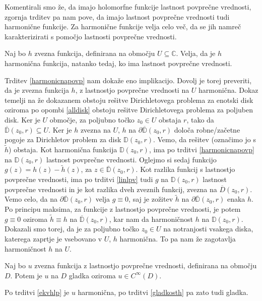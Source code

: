 \documentclass[mat1]{fmfdelo}
\newcommand{\C}{\mathbb C}
\begin{document}
    \begin{opomba}
        Komentirali smo že, da imajo holomorfne funkcije lastnost povprečne vrednosti, zgornja trditev pa nam pove, da imajo lastnost povprečne vrednosti tudi harmonične funkcije. 
        Za harmonične funkcije velja celo več, da se jih namreč karakterizirati s pomočjo lastnosti povprečne vrednosti. 
    \end{opomba}
    \begin{trditev}
        \label{ekvhlp}
        Naj bo $h$ zvezna funkcija, definirana na območju $U \subseteq \C$. Velja, da je $h$ harmonična funkcija, natanko tedaj, ko ima lastnost povprečne vrednosti.
    \end{trditev}
    \begin{dokaz}
        Trditev \ref{harmonicnapovp} nam dokaže eno implikacijo. Dovolj je torej preveriti, da je zvezna funkcija $h$, z lastnostjo povprečne vrednosti na $U$ harmonična. 
        Dokaz temelji na že dokazanem obstoju rešitve Dirichletovega problema za enotski disk oziroma po opombi \ref{alldisk} obstoju rešitve Dirichletovega problema za poljuben disk. 
        \newline
        Ker je $U$ območje, za poljubno točko $z_0 \in U$ obstaja $r$, tako da $\overline{\mathbb{D}}(z_0,r) \subseteq U$. Ker je $h$ zvezna na $U$, $h$ na $\partial \overline{\mathbb{D}}(z_0, r)$ določa robne/začetne pogoje za Dirichletov problem za disk $\mathbb{D}(z_0,r)$.
        Vemo, da rešitev (označimo jo s $\widetilde{h}$) obstaja. 
        Kot harmonična funkcija $\mathbb{D}(z_0, r)$, ima po trditvi \ref{harmonicnapovp} na $\mathbb{D}(z_0, r)$ lastnost povprečne vrednosti. 
        Oglejmo si sedaj funkcijo $g(z) = h(z) - \widetilde{h}(z)$, za $z \in \overline{\mathbb{D}}(z_0,r)$. 
        Kot razlika funkcij s lastnostjo povprečne vrednosti, ima po trditvi \ref{linlpv} tudi $g$ na $\mathbb{D}(z_0, r)$ lastnost povprečne vrednosti in je kot razlika dveh zveznih funkcij, zvezna na $\overline{D}(z_0, r)$.
        Vemo celo, da na $\partial \overline{\mathbb{D}}(z_0, r)$ velja $g \equiv 0$, saj je zožitev $\widetilde{h}$ na $\partial \overline{\mathbb{D}}(z_0,r)$ enaka $h$. 
        Po principu maksima, za funkcije z lastnostjo povprečne vrednosti, je potem $g \equiv 0$ oziroma $\widetilde{h} \equiv h$ na $\overline{\mathbb{D}}(z_0, r)$, kar nam da harmoničnost $h$ na $\mathbb{D}(z_0, r)$. 
        Dokazali smo torej, da je za poljubno točko $z_0 \in U$ na notranjosti vsakega diska, katerega zaprtje je vsebovano v $U$, $h$ harmonična. To pa nam že zagotavlja harmoničnost $h$ na $U$. 
    \end{dokaz}
    \begin{trditev}
        Naj bo $u$ zvezna funkcija z lastnostjo povprečne vrednosti, definirana na območju $D$. Potem je $u$ na $D$ gladka oziroma $u \in C^{\infty}(D)$.
    \end{trditev}
    \begin{dokaz}
        Po trditvi \ref{ekvhlp} je $u$ harmonična, po trditvi \ref{gladkosth} pa zato tudi gladka.
    \end{dokaz}
\end{document}

